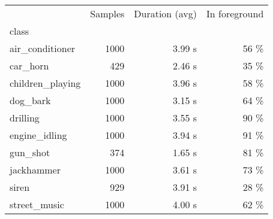 \begin{tabular}{lrrr}
\toprule
{} &  Samples & Duration (avg) & In foreground \\
class            &          &                &               \\
\midrule
air\_conditioner  &     1000 &         3.99 s &          56 \% \\
car\_horn         &      429 &         2.46 s &          35 \% \\
children\_playing &     1000 &         3.96 s &          58 \% \\
dog\_bark         &     1000 &         3.15 s &          64 \% \\
drilling         &     1000 &         3.55 s &          90 \% \\
engine\_idling    &     1000 &         3.94 s &          91 \% \\
gun\_shot         &      374 &         1.65 s &          81 \% \\
jackhammer       &     1000 &         3.61 s &          73 \% \\
siren            &      929 &         3.91 s &          28 \% \\
street\_music     &     1000 &         4.00 s &          62 \% \\
\bottomrule
\end{tabular}
